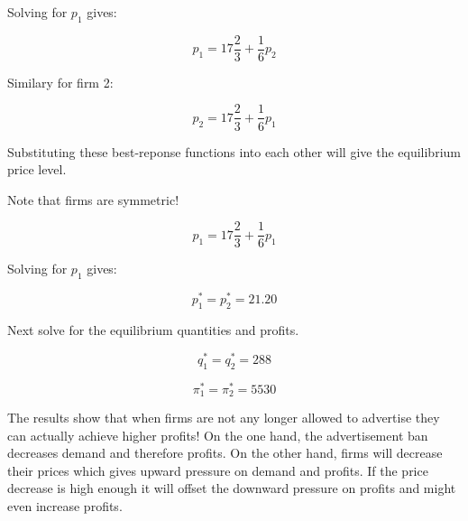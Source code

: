 \documentclass[12pt,english]{article}%
\begin{document}
Solving for $p_1$ gives:

\begin{equation}
p_1=17\frac{2}{3}+\frac{1}{6}p_2
\end{equation}

Similary for firm 2:

\begin{equation}
p_2=17\frac{2}{3}+\frac{1}{6}p_1
\end{equation}

Substituting these best-reponse functions into each other will give the equilibrium price level. 

Note that firms are symmetric!

\begin{equation}
p_1=17\frac{2}{3}+\frac{1}{6}p_1
\end{equation}

Solving for $p_1$ gives:

\begin{equation}
p_1^*=p_2^*=21.20
\end{equation}

Next solve for the equilibrium quantities and profits.

\begin{equation}
q_1^*=q_2^*=288
\end{equation}

\begin{equation}
\pi_1^*=\pi_2^*=5530
\end{equation}

The results show that when firms are not any longer allowed to advertise they can actually achieve higher profits!
On the one hand, the advertisement ban decreases demand and therefore profits. On the other hand, firms will decrease their prices which gives upward pressure on demand and profits. If the price decrease is high enough it will offset the downward pressure on profits and might even increase profits. 
\end{document}
